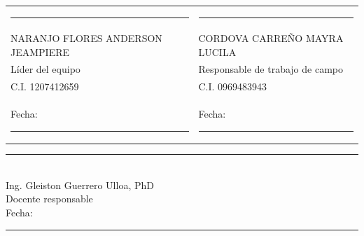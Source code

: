 \documentclass[10pt,a4paper]{article}
\newcommand{\Docente}{Ing. Gleiston Guerrero Ulloa, PhD}
\newcommand{\Anderson}{NARANJO FLORES ANDERSON JEAMPIERE}
\newcommand{\CedulaAnderson}{1207412659}
\newcommand{\Mayra}{CORDOVA CARREÑO MAYRA LUCILA}
\newcommand{\CedulaMayra}{0969483943}
\begin{document}
\vspace{0.8cm}
\noindent\begin{tabularx}{\textwidth}{@{}Y Y@{}}
\centering\rule{6.1cm}{0.4pt} & \centering\arraybackslash\rule{6.1cm}{0.4pt}\\
\centering \Anderson & \centering\arraybackslash \Mayra\\
\centering Líder del equipo & \centering\arraybackslash Responsable de trabajo de campo\\[4pt]
\centering C.I. \CedulaAnderson & \centering\arraybackslash C.I. \CedulaMayra\\[4pt]
\centering Fecha: \rule{2.7cm}{0.4pt} & \centering\arraybackslash Fecha: \rule{2.7cm}{0.4pt}
\end{tabularx}

\vspace{1.1cm}
\begin{center}
\rule{7.0cm}{0.4pt}\\
\Docente\\
Docente responsable\\[4pt]
Fecha: \rule{3.0cm}{0.4pt}
\end{center}
\end{document}
